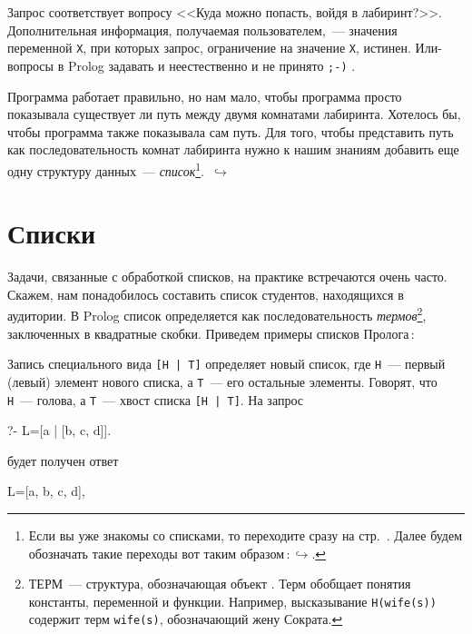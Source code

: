 \documentclass[a4paper,14pt, openany, twoside, draft]{extbook} %
\newcommand{\goforth}[1]{$\,\hookrightarrow$\pageref{#1}}
\begin{document}
Запрос соответствует вопросу <<Куда можно попасть, войдя в лабиринт?>>.  Дополнительная информация, получаемая пользователем,~--- значения переменной \texttt{X}, при которых запрос, ограничение на значение \texttt{X}, истинен.  Или-вопросы в Prolog задавать и неестественно и не принято \texttt{;-)} .

Программа работает правильно, но нам мало, чтобы программа просто показывала существует ли путь между двумя комнатами лабиринта.  Хотелось бы, чтобы программа также показывала сам путь.  Для того, чтобы представить путь как последовательность комнат лабиринта нужно к нашим знаниям добавить еще одну структуру данных~--- \emph{список}\footnote{Если вы уже знакомы со списками, то переходите сразу на стр.~\pageref{par:mazelist}.  Далее будем обозначать такие переходы вот таким образом\,:\goforth{par:mazelist}.}. \goforth{par:mazelist}

\section{Списки}

Задачи, связанные с обработкой списков, на практике встречаются очень часто. Скажем, нам понадобилось составить список студентов, находящихся в аудитории.  В Prolog список определяется как последовательность \emph{термов}\footnote{ТЕРМ~--- структура, обозначающая объект \cite{AppLog}.  Терм обобщает понятия константы, переменной и функции.  Например, высказывание \texttt{H(wife(s))} содержит терм \texttt{wife(s)}, обозначающий жену Сократа.}, заключенных в квадратные скобки.  Приведем примеры списков Пролога\,:

\begin{proexp}
\end{proexp}

  Запись специального вида {\tt [H | T]} определяет новый список, где {\tt Н}~--- первый (левый) элемент нового списка, а {\tt Т}~--- его остальные элементы.  Говорят, что {\tt Н}~--- голова, а {\tt Т}~--- хвост списка {\tt [H | T]}. На запрос

\begin{proexp}
?- L=[a | [b, c, d]].
\end{proexp}

\noindent будет получен ответ

\begin{proexp}
L=[a, b, c, d],
\end{proexp}
\end{document}
